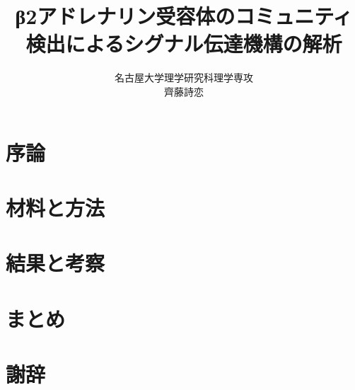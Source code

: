\documentclass[a4paper, 14pt]{ltjsreport}
\begin{document}


\title{β2アドレナリン受容体のコミュニティ検出によるシグナル伝達機構の解析}
\author{名古屋大学理学研究科理学専攻\\齊藤詩恋}


\tableofcontents

\chapter{序論}


\chapter{材料と方法}


\chapter{結果と考察}\label{chap:results}


\chapter{まとめ}


\chapter*{謝辞}


\printbibliography[title=参考文献]
\end{document}
